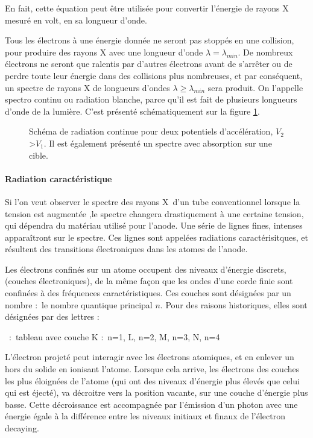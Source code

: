 En fait, cette équation peut être utilisée pour convertir l'énergie de rayons X mesuré en volt, en sa longueur d'onde.

Tous les électrons à une énergie donnée ne seront pas stoppés en une collision, pour produire des rayons X avec une longueur d'onde $\lambda = \lambda_{min}$. De nombreux électrons ne seront que ralentis par d'autres électrons avant de s'arrêter ou de perdre toute leur énergie dans des collisions plus nombreuses, et par conséquent, un spectre de rayons X de longueurs d'ondes $\lambda \geq \lambda_{min}$ sera produit. On l'appelle spectro continu ou radiation blanche, parce qu'il est fait de plusieurs longueurs d'onde de la lumière. C'est présenté schématiquement sur la figure \ref{fig:radiationblanche}.

\begin{figure}
    \TODO
    \caption{Schéma de radiation continue pour deux potentiels d'accélération, $V_2$>$V_1$. Il est également présenté un spectre avec absorption sur une cible.}
    \label{fig:radiationblanche}
\end{figure}

\paragraph{Radiation caractéristique}

Si l'on veut observer le spectre des rayons X d'un tube conventionnel lorsque la tension est augmentée ,le spectre changera drastiquement à une certaine tension, qui dépendra du matériau utilisé pour l'anode. Une série de lignes fines, intenses apparaîtront sur le spectre. Ces lignes sont appelées radiations caractérisitques, et résultent des transitions électroniques dans les atomes de l'anode.

Les électrons confinés sur un atome occupent des niveaux d'énergie discrets, (couches électroniques), de la même façon que les ondes d'une corde finie sont confinées à des fréquences caractéristiques. Ces couches sont désignées par un nombre : le nombre quantique principal $n$. Pour des raisons historiques, elles sont désignées par des lettres :

\TODO : tableau avec couche K : n=1, L, n=2, M, n=3, N, n=4

L'électron projeté peut interagir avec les électrons atomiques, et en enlever un hors du solide en ionisant l'atome. Lorsque cela arrive, les électrons des couches les plus éloignées de l'atome (qui ont des niveaux d'énergie plus élevés que celui qui est éjecté), va décroitre vers la position vacante, sur une couche d'énergie plus basse. Cette décroissance est accompagnée par l'émission d'un photon avec une énergie égale à la différence entre les niveaux initiaux et finaux de l'électron decaying.

